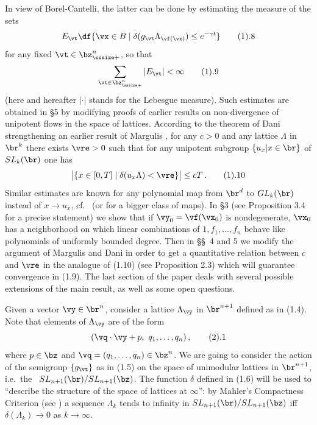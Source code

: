 In view of
Borel-Cantelli, the latter can be done by estimating the measure of the sets 
$$
E_\vt\df\{\vx\in B\mid \delta(g_\vt\Lambda_{\vf(\vx)}) \le e^{-\gamma t}\}\tag 1.8
$$
 for any fixed $\vt\in \bz_{\sssize +}^n$, so that 
$$
\sum_{\vt\in\bz_{\sssize +}^n} |E_\vt|  < \infty\tag 1.9
$$
(here and hereafter  $|\cdot|$ stands for the Lebesgue measure).
Such estimates are obtained in \S 5 by modifying proofs of earlier results  on non-divergence of unipotent flows in the space of lattices. According to the theorem of Dani \cite{D2} strengthening an earlier result of Margulis \cite{Mar},
for any $c > 0$ and any lattice $\Lambda$ in $\br^k$ there exists $\vre > 0$ such that  for any unipotent subgroup $\{u_x|x\in\br\}$ of $SL_k(\br)$ one has
$$
\big|\{x\in[0,T]\mid \delta(u_x\Lambda) < \vre\}\big| \le cT \,.\tag 1.10
$$
Similar estimates are known for any polynomial map from $\br^d$ to $GL_k(\br)$ instead of $x\to u_x$, cf.~\cite{Sh} (or \cite{EMS} for a bigger class of maps). In \S 3 (see Proposition 3.4 for a precise statement) we show that if $\vy_0 = \vf(\vx_0)$ is nondegenerate, $\vx_0$  has a neighborhood  on which linear combinations of  $1,f_1,\dots,f_n$ behave like polynomials of uniformly bounded degree. Then in \S\S\ 4 and 5 we modify the argument of Margulis and Dani in order  to get a quantitative relation between $c$ and $\vre$ in the analogue of (1.10) (see Proposition 2.3) which will guarantee convergence in (1.9). 
The last section of the paper deals with  several possible extensions of the main result, as well as some open questions. 

\endheading 

Given a vector $\vy\in\br^n$, consider a lattice $\Lambda_\vy$ in $\br^{n+1}$ defined as in (1.4). Note that elements of $\Lambda_\vy$ are of the form 
$$
(\vq\cdot\vy + p,\ q_1,\dots,q_n)\,,\tag 2.1
$$
where $p\in\bz$ and 
$\vq = (q_1,\dots,q_n)\in \bz^n$. We are going to consider the action of the semigroup $\{g_\vt\}$ as in (1.5) on the space  of unimodular lattices in $\br^{n+1}$, i.e.~the \hs\ $SL_{n+1}(\br)/SL_{n+1}(\bz)$. The function $\delta$ defined in (1.6) will be used to ``describe the structure of the space  of  lattices  at $\infty$'': by Mahler's Compactness Criterion (see \cite{R, Corollary 10.9}) a sequence  $\Lambda_k$ tends to infinity in $SL_{n+1}(\br)/SL_{n+1}(\bz)$ iff  $
\delta(\Lambda_k)\to 0$ as $k\to\infty$.

